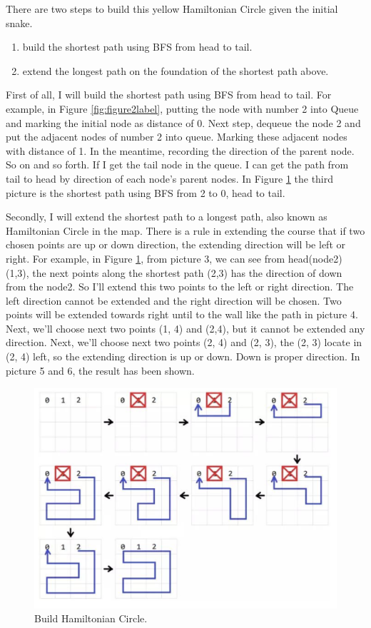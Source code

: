 \documentclass[12pt]{article}
\begin{document}
There are two steps to build this yellow Hamiltonian Circle given the initial snake.
\begin{enumerate}
    \item build the shortest path using BFS from head to tail. 
    \item extend the longest path on the foundation of the shortest path above.
\end{enumerate}

First of all, I will build the shortest path using BFS from head to tail. For example, in Figure \ref{fig:figure2label}, putting the node with number 2 into Queue and marking the initial node as distance of 0. Next step, dequeue the node 2 and put the adjacent nodes of number 2 into queue. Marking these adjacent nodes with distance of 1. In the meantime, recording the direction of the parent node. So on and so forth. If I get the tail node in the queue. I can get the path from tail to head by direction of each node's parent nodes. In Figure \ref{fig:figure3label} the third picture is the shortest path using BFS from 2 to 0, head to tail.

Secondly, I will extend the shortest path to a longest path, also known as Hamiltonian Circle in the map. There is a rule in extending the course that if two chosen points are up or down direction, the extending direction will be left or right. For example, in Figure \ref{fig:figure3label}, from picture 3, we can see from head(node2)(1,3), the next points along the shortest path (2,3) has the direction of down from the node2. So I'll extend this two points to the left or right direction. The left direction cannot be extended and the right direction will be chosen. Two points will be extended towards right until to the wall like the path in picture 4. Next, we'll choose next two points (1, 4) and (2,4), but it cannot be extended any direction. Next, we'll choose next two points (2, 4) and (2, 3), the (2, 3) locate in (2, 4) left, so the extending direction is up or down. Down is proper direction. In picture 5 and 6, the result has been shown.

\begin{figure}[H]
\centering 
\includegraphics[scale = 0.4]{2.png}
\caption{Build Hamiltonian Circle.}
\label{fig:figure3label}
\end{figure}
\end{document}
